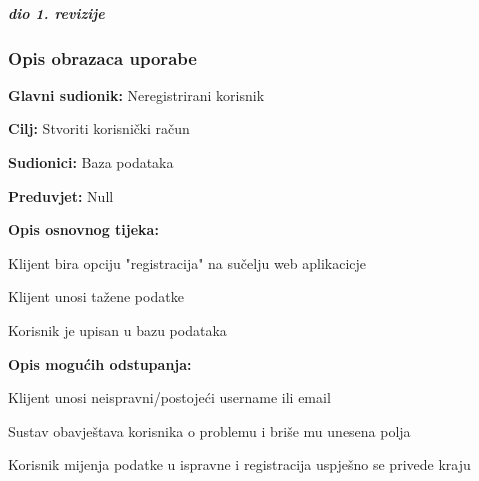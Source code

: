 				\textbf{\textit{dio 1. revizije}}
				
				\subsubsection{Opis obrazaca uporabe}
					

					\noindent {}
					\begin{packed_item}
	
						\item \textbf{Glavni sudionik: }Neregistrirani korisnik
						\item  \textbf{Cilj:} Stvoriti korisnički račun
						\item  \textbf{Sudionici:} Baza podataka
						\item  \textbf{Preduvjet:} Null
						\item  \textbf{Opis osnovnog tijeka:}
						
						\item[] \begin{packed_enum}
	
							\item Klijent bira opciju "registracija" na sučelju web aplikacicje
							\item Klijent unosi tažene podatke
							\item Korisnik je upisan u bazu podataka
						\end{packed_enum}
						
						\item  \textbf{Opis mogućih odstupanja:}
						
						\item[] \begin{packed_item}
	
							\item[2.a] Klijent unosi neispravni/postojeći username ili email
							\item[] \begin{packed_enum}
								
								\item Sustav obavještava korisnika o problemu i briše mu unesena polja
								
								\item Korisnik mijenja podatke u ispravne i registracija uspješno se privede kraju
								
							\end{packed_enum}
							
						\end{packed_item}
					\end{packed_item}
					
